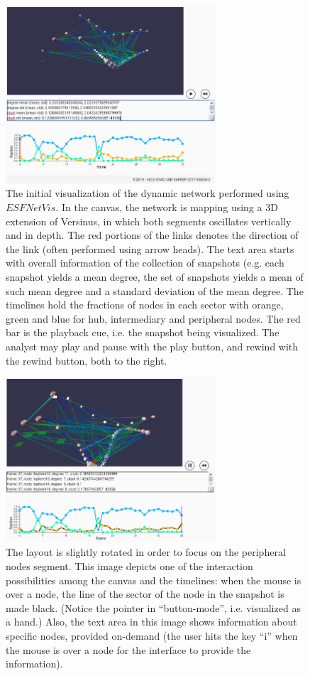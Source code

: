 \documentclass[runningheads]{llncs}
\begin{document}
\begin{figure}[!h]\centering
\includegraphics[width=0.7\textwidth]{esfNetVis2___}
  \caption{The initial visualization of the dynamic network performed using $ESFNetVis$.
  In the canvas, the network is mapping using a 3D extension of Versinus, in which both segments oscillates vertically and in depth.
  The red portions of the links denotes the direction of the link (often performed using arrow heads).
  The text area starts with overall information of the collection of snapshots (e.g. each snapshot yields a mean degree, the set of snapshots yields a mean of such mean degree and a standard deviation of the mean degree.
  The timelines hold the fractions of nodes in each sector with orange, green and blue for hub, intermediary and peripheral nodes.
  The red bar is the playback cue, i.e. the snapshot being visualized.
  The analyst may play and pause with the play button,
  and rewind with the rewind button, both to the right.
  }\label{env2}
\end{figure}

\begin{figure}[!h]\centering
\includegraphics[width=0.7\textwidth]{esfNetVis3}
  \caption{The layout is slightly rotated in order to focus on the peripheral nodes segment. This image depicts one of the interaction possibilities among the canvas and the timelines: when the mouse is over a node, the line of the sector of the node in the snapshot is made black.
  (Notice the pointer in ``button-mode'', i.e. visualized as a hand.)
  Also, the text area in this image shows information about specific nodes, provided on-demand (the user hits the key ``i'' when the mouse is over a node for the interface to provide the information). 
  }\label{env3}
\end{figure}
\end{document}
